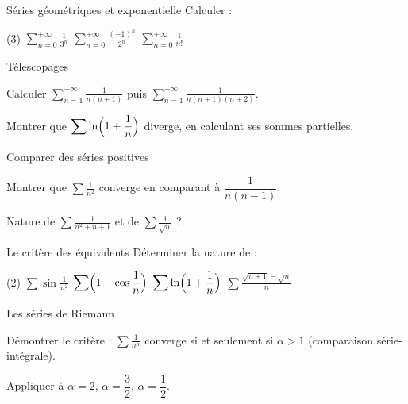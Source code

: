 \begin{exercice}[1]{Séries géométriques et exponentielle}
Calculer :
\begin{tasks}(3)
  \task $\displaystyle\sum_{n=0}^{+\infty}\frac{1}{3^{n}}$
  \task $\displaystyle\sum_{n=0}^{+\infty}\frac{(-1)^{n}}{2^{n}}$
  \task $\displaystyle\sum_{n=0}^{+\infty}\frac{1}{n!}$
\end{tasks}
\end{exercice}

\begin{exercice}[1]{Télescopages}
\begin{questions}
  \item Calculer $\displaystyle\sum_{n=1}^{+\infty}\frac{1}{n(n+1)}$ puis
    $\displaystyle\sum_{n=1}^{+\infty}\frac{1}{n(n+1)(n+2)}$.
  \item Montrer que $\displaystyle\sum\ln\Bigl(1+\frac1n\Bigr)$ diverge,
    en calculant ses sommes partielles.
\end{questions}
\end{exercice}

\begin{exercice}[1]{Comparer des séries positives}
\begin{questions}
  \item Montrer que $\displaystyle\sum\frac{1}{n^{2}}$ converge en
    comparant à $\dfrac{1}{n(n-1)}$.
  \item Nature de $\displaystyle\sum\frac{1}{n^{2}+n+1}$ et de
    $\displaystyle\sum\frac{1}{\sqrt n}$ ?
\end{questions}
\end{exercice}

\begin{exercice}[1]{Le critère des équivalents}
Déterminer la nature de :
\begin{tasks}(2)
  \task $\displaystyle\sum\sin\frac{1}{n^{2}}$
  \task $\displaystyle\sum\Bigl(1-\cos\frac1n\Bigr)$
  \task $\displaystyle\sum\ln\Bigl(1+\frac1n\Bigr)$
  \task $\displaystyle\sum\frac{\sqrt{n+1}-\sqrt n}{n}$
\end{tasks}
\end{exercice}

\begin{exercice}[1]{Les séries de Riemann}
\begin{questions}
  \item Démontrer le critère : $\displaystyle\sum\frac{1}{n^{\alpha}}$
    converge si et seulement si $\alpha>1$ (comparaison
    série-intégrale).
  \item Appliquer à $\alpha=2$, $\alpha=\dfrac32$, $\alpha=\dfrac12$.
\end{questions}
\end{exercice}

